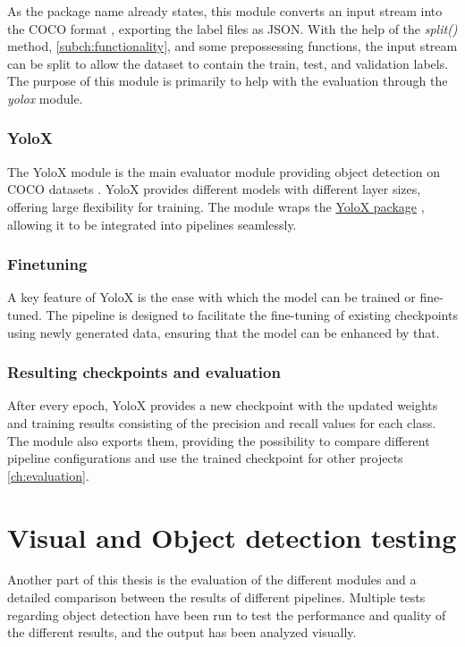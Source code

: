 As the package name already states, this module converts an input stream into the COCO format \cite{lin2015microsoftcococommonobjects}, exporting the label files as JSON. With the help of the \textit{split()} method, \autoref{subch:functionality}, and some prepossessing functions, the input stream can be split to allow the dataset to contain the train, test, and validation labels. The purpose of this module is primarily to help with the evaluation through the \textit{yolox} module.

\subsubsection{YoloX}
The YoloX module is the main evaluator module providing object detection on COCO datasets \cite{lin2015microsoftcococommonobjects}. YoloX provides different models with different layer sizes, offering  large flexibility for training. The module wraps the \href{https://github.com/Megvii-BaseDetection/YOLOX}{YoloX package} \cite{yolox2021}, allowing it to be integrated into pipelines seamlessly.

\subsubsection{Finetuning}
A key feature of YoloX is the ease with which the model can be trained or fine-tuned. The pipeline is designed to facilitate the fine-tuning of existing checkpoints using newly generated data, ensuring that the model can be enhanced by that.

\subsubsection{Resulting checkpoints and evaluation}
After every epoch, YoloX provides a new checkpoint with the updated weights and training results consisting of the precision and recall values for each class. The module also exports them, providing the possibility to compare different pipeline configurations and use the trained checkpoint for other projects \autoref{ch:evaluation}.

\section{Visual and Object detection testing}
Another part of this thesis is the evaluation of the different modules and a detailed comparison between the results of different pipelines. Multiple tests regarding object detection have been run to test the performance and quality of the different results, and the output has been analyzed visually.

